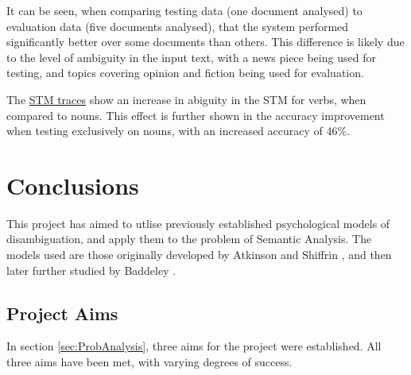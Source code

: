 \documentclass[]{article}
\begin{document}
It can be seen, when comparing testing data (one document analysed) to evaluation data (five documents analysed), that the system performed significantly better over some documents than others. This difference is likely due to the level of ambiguity in the input text, with a news piece being used for testing, and topics covering opinion and fiction being used for evaluation.

The \hyperref[sec:EvTrace]{STM traces} show an increase in abiguity in the STM for verbs, when compared to nouns. This effect is further shown in the accuracy improvement when testing exclusively on nouns, with an increased accuracy of 46\%.



\section{Conclusions}
\label{sec:Conclusions}
This project has aimed to utlise previously established psychological models of disambiguation, and apply them to the problem of Semantic Analysis. The models used are those originally developed by Atkinson and Shiffrin \cite{ControlProcessesSTMAtkinson}, and then later further studied by Baddeley \cite{MemoryBaddeleyEysenkAnderson}.

\subsection{Project Aims}
\label{ConcAims}
In section \ref{sec:ProbAnalysis}, three aims for the project were established. All three aims have been met, with varying degrees of success.
\end{document}
